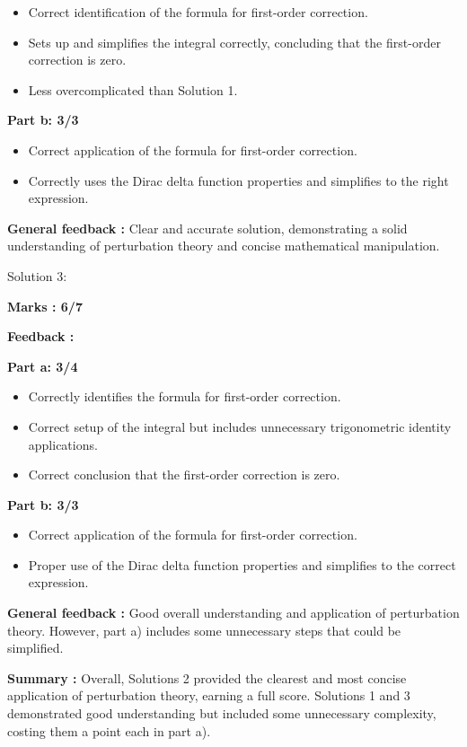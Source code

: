 \documentclass[a4paper,11pt]{article}
\begin{document}
\begin{itemize}
    \item Correct identification of the formula for first-order correction.
    \item Sets up and simplifies the integral correctly, concluding that the first-order correction is zero.
    \item Less overcomplicated than Solution 1.
\end{itemize}

\textbf{Part b: 3/3}
\begin{itemize}
    \item Correct application of the formula for first-order correction.
    \item Correctly uses the Dirac delta function properties and simplifies to the right expression.
\end{itemize}

\textbf{General feedback :}
Clear and accurate solution, demonstrating a solid understanding of perturbation theory and concise mathematical manipulation.



Solution 3:


\textbf{ Marks : 6/7}

\textbf{Feedback :}

\textbf{Part a: 3/4}

\begin{itemize}
    \item Correctly identifies the formula for first-order correction.
    \item Correct setup of the integral but includes unnecessary trigonometric identity applications.
    \item Correct conclusion that the first-order correction is zero.
\end{itemize}

\textbf{Part b: 3/3}
\begin{itemize}
    \item Correct application of the formula for first-order correction.
    \item Proper use of the Dirac delta function properties and simplifies to the correct expression.
\end{itemize}

\textbf{General feedback :}
Good overall understanding and application of perturbation theory. However, part a) includes some unnecessary steps that could be simplified.

\textbf{Summary :}
Overall, Solutions 2 provided the clearest and most concise application of perturbation theory, earning a full score. Solutions 1 and 3 demonstrated good understanding but included some unnecessary complexity, costing them a point each in part a).
\end{document}
